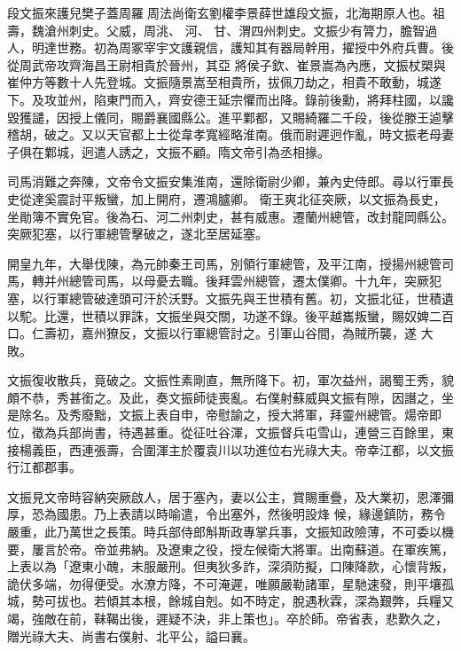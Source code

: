 
\begin{pinyinscope}

 段文振來護兒樊子蓋周羅周法尚衛玄劉權李景薛世雄段文振，北海期原人也。祖壽，魏滄州刺史。父威，周洮、
 河、
 甘、渭四州刺史。文振少有膂力，膽智過人，明達世務。初為周冢宰宇文護親信，護知其有器局幹用，擢授中外府兵曹。後從周武帝攻齊海昌王尉相貴於晉州，其亞
 將侯子欽、崔景嵩為內應，文振杖槊與崔仲方等數十人先登城。文振隨景嵩至相貴所，拔佩刀劫之，相貴不敢動，城遂下。及攻並州，陷東門而入，齊安德王延宗懼而出降。錄前後勳，將拜柱國，以讒毀獲譴，因授上儀同，賜爵襄國縣公。進平鄴都，又賜綺羅二千段，後從滕王逌擊稽胡，破之。又以天官都上士從韋孝寬經略淮南。俄而尉遲迥作亂，時文振老母妻子俱在鄴城，迥遣人誘之，文振不顧。隋文帝引為丞相掾。



 司馬消難之奔陳，文帝令文振安集淮南，還除衛尉少卿，兼內史侍郎。尋以行軍長史從達奚震討平叛蠻，加上開府，遷鴻臚卿。
 衛王爽北征突厥，以文振為長史，坐勛簿不實免官。後為石、河二州刺史，甚有威惠。遷蘭州總管，改封龍岡縣公。突厥犯塞，以行軍總管擊破之，遂北至居延塞。



 開皇九年，大舉伐陳，為元帥秦王司馬，別領行軍總管，及平江南，授揚州總管司馬，轉并州總管司馬，以母憂去職。後拜雲州總管，遷太僕卿。十九年，突厥犯塞，以行軍總管破達頭可汗於沃野。文振先與王世積有舊。初，文振北征，世積遺以駝。比還，世積以罪誅，文振坐與交關，功遂不錄。後平越巂叛蠻，賜奴婢二百口。仁壽初，嘉州獠反，文振以行軍總管討之。引軍山谷間，為賊所襲，遂
 大敗。



 文振復收散兵，竟破之。文振性素剛直，無所降下。初，軍次益州，謁蜀王秀，貌頗不恭，秀甚銜之。及此，奏文振師徒喪亂。右僕射蘇威與文振有隙，因譖之，坐是除名。及秀廢黜，文振上表自申，帝慰諭之，授大將軍，拜靈州總管。煬帝即位，徵為兵部尚書，待遇甚重。從征吐谷渾，文振督兵屯雪山，連營三百餘里，東接楊義臣，西連張壽，合圍渾主於覆袁川以功進位右光祿大夫。帝幸江都，以文振行江都郡事。



 文振見文帝時容納突厥啟人，居于塞內，妻以公主，賞賜重疊，及大業初，恩澤彌厚，恐為國患。乃上表請以時喻遣，令出塞外，然後明設烽
 候，緣邊鎮防，務令嚴重，此乃萬世之長策。時兵部侍郎斛斯政專掌兵事，文振知政險薄，不可委以機要，屢言於帝。帝並弗納。及遼東之役，授左候衛大將軍。出南蘇道。在軍疾篤，上表以為「遼東小醜，未服嚴刑。但夷狄多詐，深須防擬，口陳降款，心懷背叛，詭伏多端，勿得便受。水潦方降，不可淹遲，唯願嚴勒諸軍，星馳速發，則平壤孤城，勢可拔也。若傾其本根，餘城自剋。如不時定，脫遇秋霖，深為艱弊，兵糧又竭，強敵在前，靺鞨出後，遲疑不決，非上策也」。卒於師。帝省表，悲歎久之，贈光祿大夫、尚書右僕射、北平公，謚曰襄。




\end{pinyinscope}
